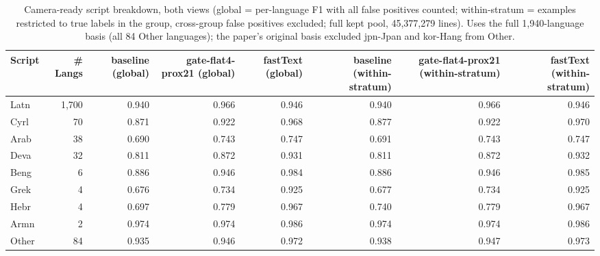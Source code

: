 \begin{table}[htbp]
\centering
\small
\begin{tabular}{lrrrrrrr}
\toprule
\textbf{Script} & \textbf{# Langs} & \textbf{baseline (global)} & \textbf{gate-flat4-prox21 (global)} & \textbf{fastText (global)} & \textbf{baseline (within-stratum)} & \textbf{gate-flat4-prox21 (within-stratum)} & \textbf{fastText (within-stratum)} \\
\midrule
Latn & 1,700 & 0.940 & 0.966 & 0.946 & 0.940 & 0.966 & 0.946 \\
Cyrl & 70 & 0.871 & 0.922 & 0.968 & 0.877 & 0.922 & 0.970 \\
Arab & 38 & 0.690 & 0.743 & 0.747 & 0.691 & 0.743 & 0.747 \\
Deva & 32 & 0.811 & 0.872 & 0.931 & 0.811 & 0.872 & 0.932 \\
Beng & 6 & 0.886 & 0.946 & 0.984 & 0.886 & 0.946 & 0.985 \\
Grek & 4 & 0.676 & 0.734 & 0.925 & 0.677 & 0.734 & 0.925 \\
Hebr & 4 & 0.697 & 0.779 & 0.967 & 0.740 & 0.779 & 0.967 \\
Armn & 2 & 0.974 & 0.974 & 0.986 & 0.974 & 0.974 & 0.986 \\
Other & 84 & 0.935 & 0.946 & 0.972 & 0.938 & 0.947 & 0.973 \\
\bottomrule
\end{tabular}
\caption{Camera-ready script breakdown, both views (global = per-language F1 with all false positives counted; within-stratum = examples restricted to true labels in the group, cross-group false positives excluded; full kept pool, 45,377,279 lines). Uses the full 1,940-language basis (all 84 Other languages); the paper's original basis excluded jpn-Jpan and kor-Hang from Other.}
\label{tab:paper_breakdowns_script}
\end{table}
